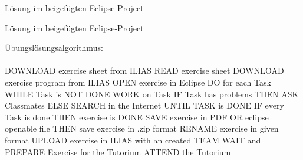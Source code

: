 \documentclass[12pt]{scrartcl}
\begin{document}

\exercise{}
Lösung im beigefügten Eclipse-Project

\exercise{}
Lösung im beigefügten Eclipse-Project

\exercise{}
Übungslösungsalgorithmus:
\\\\
DOWNLOAD exercise sheet from ILIAS \newline
READ exercise sheet \newline
DOWNLOAD exercise program from ILIAS \newline
OPEN exercise in Eclipse \newline
DO for each Task \newline
WHILE Task is NOT DONE \newline
\null\quad WORK on Task \newline
\null\quad IF Task has problems \newline
\null\qquad THEN ASK Classmates \newline
\null\quad ELSE SEARCH in the Internet \newline
\null\quad UNTIL TASK is DONE \newline
IF every Task is done \newline
\null\quad THEN exercise is DONE \newline
SAVE exercise in PDF OR eclipse openable file \newline
THEN save exercise in .zip format \newline
RENAME exercise in given format \newline
UPLOAD exercise in ILIAS with an created TEAM \newline
WAIT and PREPARE Exercise for the Tutorium \newline
ATTEND the Tutorium
		

\end{document}

